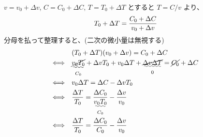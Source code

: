 \documentclass[10pt,a4paper]{ltjsarticle}
\begin{document}
\vspace{\baselineskip}

\begin{tcolorbox}[title=式 (\ref{delta_T}) の導出]
    $v = v_0 + \Delta v$, $C=C_0 + \Delta C$, $T = T_0 + \Delta T$ とすると $T = C/v$ より、
    \begin{equation}
        T_0 + \Delta T = \frac{C_0 + \Delta C}{v_0 + \Delta v} \notag
    \end{equation}
    分母を払って整理すると、(二次の微小量は無視する)
    \begin{align}
        & (T_0 + \Delta T)(v_0 + \Delta v) = C_0 + \Delta C \notag \\
        \Longleftrightarrow\quad & \underset{C_0}{\uwave{\cancel{v_0 T_0}}} + \Delta v T_0 + v_0 \Delta T +
        \underset{0}{\uwave{\cancel{\Delta v \Delta T}}}
        = \cancel{C_0} + \Delta C \notag \\
        \Longleftrightarrow\quad & v_0 \Delta T = \Delta C- \Delta v T_0 \notag \\
        \Longleftrightarrow\quad & \frac{\Delta T}{T_0} = \frac{\Delta C_0}{\underset{C_0}{\uwave{v_0 T_0}}} - \frac{\Delta v}{v_0} \notag \\
        \Longleftrightarrow\quad & \frac{\Delta T}{T_0} = \frac{\Delta C_0}{C_0} - \frac{\Delta v}{v_0} \notag
    \end{align}
\end{tcolorbox}

\end{document}
